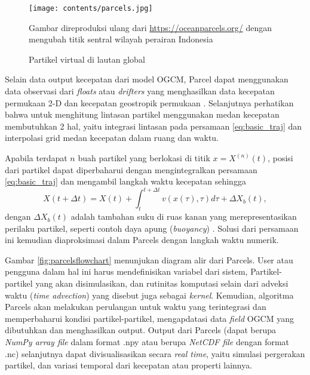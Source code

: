 \begin{spacing}{1.5}
	\begin{figure}[H]
		\centering
		\texttt{[image: contents/parcels.jpg]}
		\caption{Partikel virtual di lautan global}
		\label{fig:partikel}
		\medskip
		\small
		Gambar direproduksi ulang dari \href{https://oceanparcels.org/}{https://oceanparcels.org/} dengan mengubah titik sentral wilayah perairan Indonesia
	\end{figure}
	\par Selain data output kecepatan dari model OGCM, Parcel dapat menggunakan data observasi dari \textit{floats} atau \textit{drifters} yang menghasilkan data kecepatan permukaan 2-D dan kecepatan geostropik permukaan . Selanjutnya perhatikan bahwa untuk menghitung lintasan partikel menggunakan medan kecepatan membutuhkan 2 hal, yaitu integrasi lintasan pada persamaan \ref{eq:basic_traj} dan interpolasi grid medan kecepatan dalam ruang dan waktu. 
	\par Apabila terdapat $n$ buah partikel yang berlokasi di titik $x=X^{(n)}(t)$, posisi dari partikel dapat diperbaharui dengan mengintegralkan persamaan \ref{eq:basic_traj} dan mengambil langkah waktu kecepatan sehingga
	\begin{equation}\label{eq:traj}
		X(t+\Delta t) = X(t)+\int_{t}^{t+\Delta t}v(x(\tau),\tau)d\tau + \Delta X_b(t),
	\end{equation}
	dengan $\Delta X_b(t)$ adalah tambahan suku di ruas kanan yang merepresentasikan perilaku partikel, seperti contoh daya apung (\textit{buoyancy}) . Solusi dari persamaan ini kemudian diaproksimasi dalam Parcels dengan langkah waktu numerik.
	\par Gambar \ref{fig:parcelsflowchart} menunjukan diagram alir dari Parcels. User atau pengguna dalam hal ini harus mendefinisikan variabel dari sistem, Partikel-partikel yang akan disimulasikan, dan rutinitas komputasi selain dari adveksi waktu (\textit{time advection}) yang disebut juga sebagai \textit{kernel}. Kemudian, algoritma Parcels akan melakukan perulangan untuk waktu yang terintegrasi dan memperbaharui kondisi partikel-partikel, mengapdatasi data \textit{field} OGCM yang dibutuhkan dan menghasilkan output. Output dari Parcels (dapat berupa \textit{NumPy array file} dalam format .npy atau berupa \textit{NetCDF file} dengan format .nc) selanjutnya dapat divisualisasikan secara \textit{real time}, yaitu simulasi pergerakan partikel, dan variasi temporal dari kecepatan atau properti lainnya.


\end{spacing}
